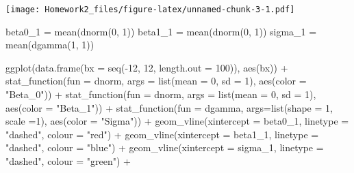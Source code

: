 \documentclass[
]{article}
\newenvironment{Shaded}{\begin{snugshade}}{\end{snugshade}}
\newcommand{\AttributeTok}[1]{\textcolor[rgb]{0.77,0.63,0.00}{#1}}
\newcommand{\DecValTok}[1]{\textcolor[rgb]{0.00,0.00,0.81}{#1}}
\newcommand{\FunctionTok}[1]{\textcolor[rgb]{0.00,0.00,0.00}{#1}}
\newcommand{\NormalTok}[1]{#1}
\newcommand{\OtherTok}[1]{\textcolor[rgb]{0.56,0.35,0.01}{#1}}
\newcommand{\SpecialCharTok}[1]{\textcolor[rgb]{0.00,0.00,0.00}{#1}}
\newcommand{\StringTok}[1]{\textcolor[rgb]{0.31,0.60,0.02}{#1}}
\begin{document}
\texttt{[image: Homework2\_files/figure-latex/unnamed-chunk-3-1.pdf]}

\begin{Shaded}
\begin{Highlighting}[]
\NormalTok{beta0\_1 }\OtherTok{=} \FunctionTok{mean}\NormalTok{(}\FunctionTok{dnorm}\NormalTok{(}\DecValTok{0}\NormalTok{, }\DecValTok{1}\NormalTok{))}
\NormalTok{beta1\_1 }\OtherTok{=} \FunctionTok{mean}\NormalTok{(}\FunctionTok{dnorm}\NormalTok{(}\DecValTok{0}\NormalTok{, }\DecValTok{1}\NormalTok{))}
\NormalTok{sigma\_1 }\OtherTok{=} \FunctionTok{mean}\NormalTok{(}\FunctionTok{dgamma}\NormalTok{(}\DecValTok{1}\NormalTok{, }\DecValTok{1}\NormalTok{))}

\FunctionTok{ggplot}\NormalTok{(}\FunctionTok{data.frame}\NormalTok{(}\AttributeTok{bx =} \FunctionTok{seq}\NormalTok{(}\SpecialCharTok{{-}}\DecValTok{12}\NormalTok{, }\DecValTok{12}\NormalTok{, }\AttributeTok{length.out =} \DecValTok{100}\NormalTok{)), }\FunctionTok{aes}\NormalTok{(bx)) }\SpecialCharTok{+}
  \FunctionTok{stat\_function}\NormalTok{(}\AttributeTok{fun =}\NormalTok{ dnorm, }\AttributeTok{args =} \FunctionTok{list}\NormalTok{(}\AttributeTok{mean =} \DecValTok{0}\NormalTok{, }\AttributeTok{sd =} \DecValTok{1}\NormalTok{), }\FunctionTok{aes}\NormalTok{(}\AttributeTok{color =} \StringTok{"Beta\_0"}\NormalTok{)) }\SpecialCharTok{+} 
  \FunctionTok{stat\_function}\NormalTok{(}\AttributeTok{fun =}\NormalTok{ dnorm, }\AttributeTok{args =} \FunctionTok{list}\NormalTok{(}\AttributeTok{mean =} \DecValTok{0}\NormalTok{, }\AttributeTok{sd =} \DecValTok{1}\NormalTok{), }\FunctionTok{aes}\NormalTok{(}\AttributeTok{color =} \StringTok{"Beta\_1"}\NormalTok{)) }\SpecialCharTok{+} 
  \FunctionTok{stat\_function}\NormalTok{(}\AttributeTok{fun =}\NormalTok{ dgamma, }\AttributeTok{args=}\FunctionTok{list}\NormalTok{(}\AttributeTok{shape =} \DecValTok{1}\NormalTok{, }\AttributeTok{scale =}\DecValTok{1}\NormalTok{), }\FunctionTok{aes}\NormalTok{(}\AttributeTok{color =} \StringTok{"Sigma"}\NormalTok{)) }\SpecialCharTok{+}
  \FunctionTok{geom\_vline}\NormalTok{(}\AttributeTok{xintercept =}\NormalTok{ beta0\_1, }\AttributeTok{linetype =} \StringTok{"dashed"}\NormalTok{, }\AttributeTok{colour =} \StringTok{"red"}\NormalTok{) }\SpecialCharTok{+}
  \FunctionTok{geom\_vline}\NormalTok{(}\AttributeTok{xintercept =}\NormalTok{ beta1\_1, }\AttributeTok{linetype =} \StringTok{"dashed"}\NormalTok{, }\AttributeTok{colour =} \StringTok{"blue"}\NormalTok{) }\SpecialCharTok{+}
  \FunctionTok{geom\_vline}\NormalTok{(}\AttributeTok{xintercept =}\NormalTok{ sigma\_1, }\AttributeTok{linetype =} \StringTok{"dashed"}\NormalTok{, }\AttributeTok{colour =} \StringTok{"green"}\NormalTok{) }\SpecialCharTok{+}

\end{Highlighting}
\end{Shaded}
\end{document}
